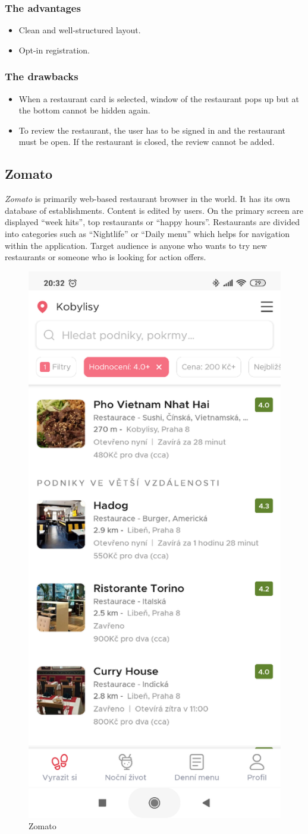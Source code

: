\subsubsection{The advantages}
\begin{itemize}
    \item Clean and well-structured layout.
    \item Opt-in registration.
\end{itemize}

\subsubsection{The drawbacks}
\begin{itemize}
    \item When a restaurant card is selected, window of the restaurant pops up but at the bottom cannot be hidden again.
    \item To review the restaurant, the user has to be signed in and the restaurant must be open. If the restaurant is closed, the review cannot be added.
\end{itemize}

\subsection{Zomato}
\textit{Zomato} is primarily web-based restaurant browser in the world. It has its own database of establishments. Content is edited by users.  
On the primary screen are displayed ``week hits'', top restaurants or ``happy hours''. Restaurants are divided into categories such as ``Nightlife'' or ``Daily menu'' which helps for navigation within the application.
Target audience is anyone who wants to try new restaurants or someone who is looking for action offers.

\begin{figure}[ht]
    \centering
    \includegraphics[width=0.33\linewidth]{img/analysis/zomato.png}
    \caption{Zomato \cite{app-zomato}}
    \label{fig:zomato}
\end{figure}

